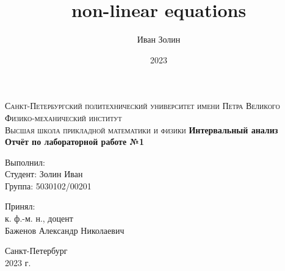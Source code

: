 \documentclass[a4paper,14pt]{article}
\title{non-linear equations}
\author{Иван Золин}
\date{2023}
\begin{document}
	
	\begin{titlepage}
		\begin{center}
			\textsc{
				Санкт-Петербургский политехнический университет имени Петра Великого \\[5mm]
				Физико-механический институт\\[2mm]
				Высшая школа прикладной математики и физики            
			}   
			\vfill
			\textbf{\large
				Интервальный анализ\\
				Отчёт по лабораторной работе №1 \\[3mm]
			}                
		\end{center}
		
		\vfill
		\hfill
		\begin{minipage}{0.5\textwidth}
			Выполнил: \\[2mm]   
			Студент: Золин Иван \\
			Группа: 5030102/00201\\
		\end{minipage}
		
		\hfill
		\begin{minipage}{0.5\textwidth}
			Принял: \\[2mm]
			к. ф.-м. н., доцент \\   
			Баженов Александр Николаевич
		\end{minipage}
		
		\vfill
		\begin{center}
			Санкт-Петербург \\2023 г.
		\end{center}
	\end{titlepage}
	
	\tableofcontents
	\newpage
	
\end{document}
